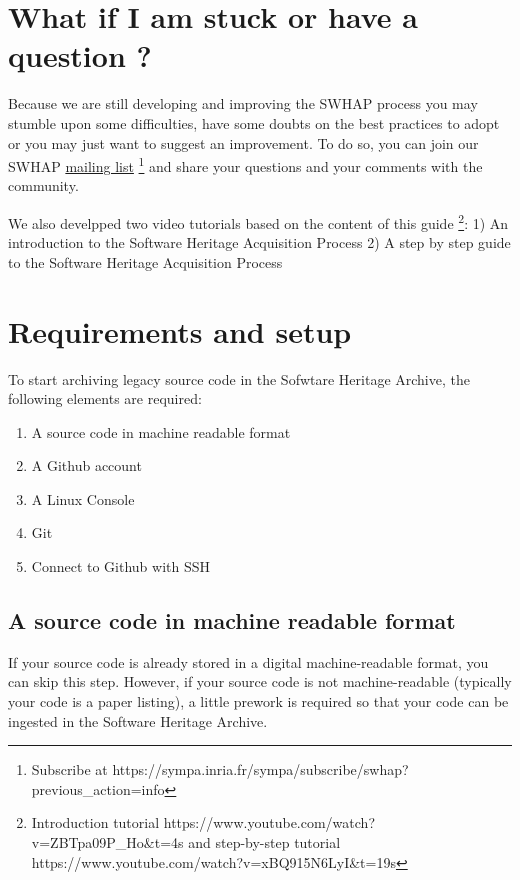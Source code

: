 \documentclass[]{article}
\providecommand{\tightlist}{%
  \setlength{\itemsep}{0pt}\setlength{\parskip}{0pt}}
\begin{document}
\hypertarget{sec:Iamstuck}{%
\section{What if I am stuck or have a question ?}\label{sec:Iamstuck}}

Because we are still developing and improving the SWHAP process you may
stumble upon some difficulties, have some doubts on the best practices
to adopt or you may just want to suggest an improvement. To do so, you
can join our SWHAP
\href{https://sympa.inria.fr/sympa/subscribe/swhap?previous_action=info}{mailing
list} \footnote{Subscribe at
  https://sympa.inria.fr/sympa/subscribe/swhap?previous\_action=info}
and share your questions and your comments with the community.

We also develpped two video tutorials based on the content of this guide
\footnote{Introduction tutorial
  https://www.youtube.com/watch?v=ZBTpa09P\_Ho\&t=4s and step-by-step
  tutorial https://www.youtube.com/watch?v=xBQ915N6LyI\&t=19s}: 1) An
introduction to the Software Heritage Acquisition Process 2) A step by
step guide to the Software Heritage Acquisition Process

\hypertarget{sec:requirements}{%
\section{Requirements and setup}\label{sec:requirements}}

To start archiving legacy source code in the Sofwtare Heritage Archive,
the following elements are required:

\begin{enumerate}
\def\labelenumi{\arabic{enumi})}
\tightlist
\item
  A source code in machine readable format
\item
  A Github account
\item
  A Linux Console
\item
  Git
\item
  Connect to Github with SSH
\end{enumerate}

\hypertarget{a-source-code-in-machine-readable-format}{%
\subsection{A source code in machine readable
format}\label{a-source-code-in-machine-readable-format}}

If your source code is already stored in a digital machine-readable
format, you can skip this step. However, if your source code is not
machine-readable (typically your code is a paper listing), a little
prework is required so that your code can be ingested in the Software
Heritage Archive.
\end{document}
